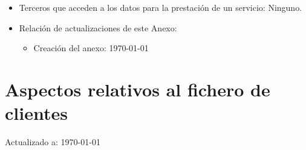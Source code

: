 \documentclass[a4paper,11pt,bibtotoc,noliststotoc]{scrbook}
\begin{document}
\begin{itemize}
\item Terceros que acceden a los datos para la prestación de un servicio: Ninguno.

\item Relación de actualizaciones de este Anexo: 

	\begin{itemize}
	\item Creación del anexo: \today
	\end{itemize}

\end{itemize}






\section{Aspectos relativos al fichero de clientes}


Actualizado a: \today
\end{document}
